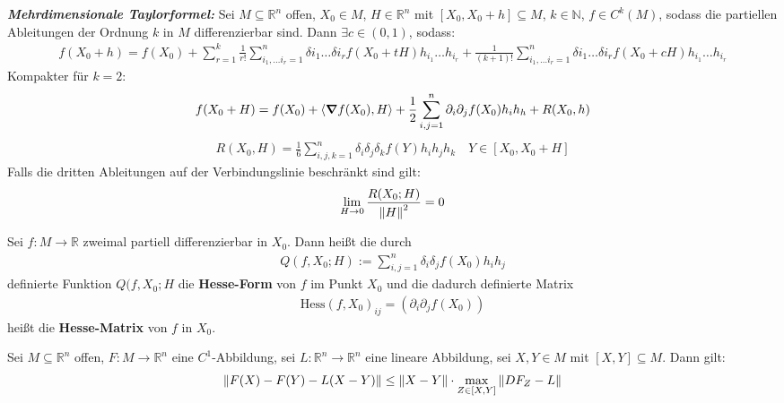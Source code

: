 \documentclass{report}
\newcommand{\tbf}[1]{\textbf{#1}}
\newcommand{\Hess}[1]{\text{Hess}(#1)}
\newcommand{\bN}{\mathbb{N}}
\newcommand{\bR}{\mathbb{R}}
\newcommand{\scalar}[2]{\left\langle #1, #2 \right\rangle}
\begin{document}
\begin{theorem}
 \emph{\tbf{Mehrdimensionale Taylorformel:}} Sei $M \subseteq \bR^n$ offen, $X_0 \in M$, $H \in \bR^n$ mit $[X_0, X_0 + h] \subseteq M$, $k \in \bN$, $f \in C^k(M)$, sodass die partiellen Ableitungen der Ordnung $k$ in $M$ differenzierbar sind. Dann $\exists c \in (0,1)$, sodass:
 \begin{align*}
  f(X_0 + h) = f(X_0) + \sum_{r=1}^k \frac{1}{r!} \sum_{i_1, \hdots i_r = 1}^n \delta{i_1} \hdots \delta{i_r} f(X_0 + tH) h_{i_1} \hdots h_{i_r} + \frac{1}{(k+1)!}  \sum_{i_1, \hdots i_r = 1}^n \delta{i_1} \hdots \delta{i_r} f(X_0 + cH) h_{i_1} \hdots h_{i_r}
 \end{align*}
 Kompakter für $k = 2$:
 \begin{align*}
  f(X_0 + H) = f(X_0) + \scalar{\grad f(X_0)}{H} + \frac{1}{2} \sum_{i,j=1}^n \partial_i \partial_j f(X_0) h_i h_h + R(X_0, h)
 \end{align*}
 \begin{align*}
  R(X_0, H) = \frac{1}{6}\sum_{i,j,k=1}^n \delta_i \delta_j \delta_k f(Y) h_i h_j h_k \quad Y \in [X_0, X_0 + H]
 \end{align*}
 Falls die dritten Ableitungen auf der Verbindungslinie beschränkt sind gilt:
 \begin{align*}
  \lim_{H \to 0} \frac{R(X_0; H)}{\norm{H}^2} = 0
 \end{align*}
\end{theorem}
\begin{theorem}
 Sei $f : M \to \bR$ zweimal partiell differenzierbar in $X_0$. Dann heißt die durch
 \begin{align*}
  Q(f,X_0;H) := \sum_{i,j=1}^n \delta_i \delta_j f(X_0) h_i h_j
 \end{align*}
 definierte Funktion $Q(f,X_0;H$ die \tbf{Hesse-Form} von $f$ im Punkt $X_0$ und die dadurch definierte Matrix
 \begin{align*}
  \Hess{f, X_0}_{ij} = (\partial_i \partial_j f(X_0))
 \end{align*}
 heißt die \tbf{Hesse-Matrix} von $f$ in $X_0$.
\end{theorem}
\clearpage
[...]
\clearpage
\begin{lemma}
 Sei $M \subseteq \bR^n$ offen, $F : M \to \bR^n$ eine $C^1$-Abbildung, sei $L : \bR^n \to \bR^n$ eine lineare Abbildung, sei $X, Y \in M$ mit $[X, Y] \subseteq M$. Dann gilt:
 \begin{align*}
  \norm{F(X) - F(Y) - L(X-Y)} \leq \norm{X - Y} \cdot \max_{Z \in [X,Y]} \norm{DF_Z - L}
 \end{align*}
\end{lemma}
\end{document}
